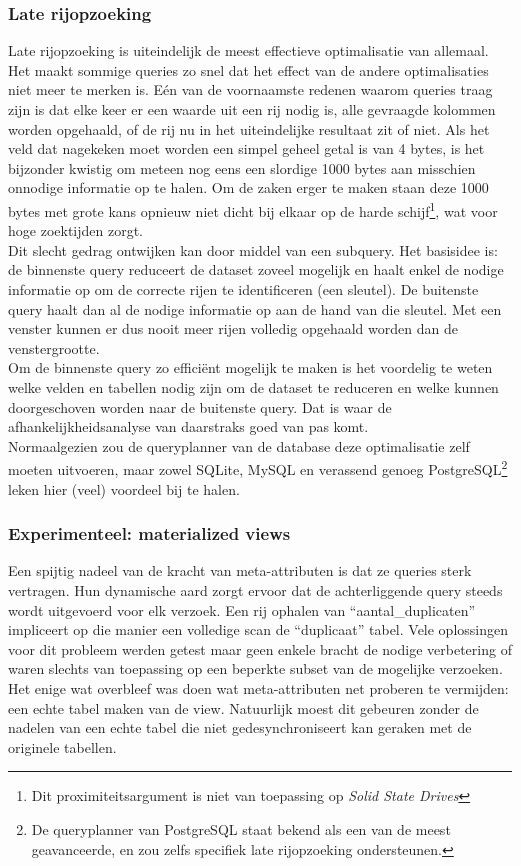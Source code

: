 \subsubsection{Late rijopzoeking}
Late rijopzoeking is uiteindelijk de meest effectieve optimalisatie van allemaal. Het maakt sommige queries zo snel dat het effect van de andere optimalisaties niet meer te merken is. E\'en van de voornaamste redenen waarom queries traag zijn is dat elke keer er een waarde uit een rij nodig is, alle gevraagde kolommen worden opgehaald, of de rij nu in het uiteindelijke resultaat zit of niet. Als het veld dat nagekeken moet worden een simpel geheel getal is van 4 bytes, is het bijzonder kwistig om meteen nog eens een slordige 1000 bytes aan misschien onnodige informatie op te halen. Om de zaken erger te maken staan deze 1000 bytes met grote kans opnieuw niet dicht bij elkaar op de harde schijf\footnote{Dit proximiteitsargument is niet van toepassing op \emph{Solid State Drives}}, wat voor hoge zoektijden zorgt.\\

Dit slecht gedrag ontwijken kan door middel van een subquery. Het basisidee is: de binnenste query reduceert de dataset zoveel mogelijk en haalt enkel de nodige informatie op om de correcte rijen te identificeren (een sleutel). De buitenste query haalt dan al de nodige informatie op aan de hand van die sleutel. Met een venster kunnen er dus nooit meer rijen volledig opgehaald worden dan de venstergrootte.\\

Om de binnenste query zo effici\"ent mogelijk te maken is het voordelig te weten welke velden en tabellen nodig zijn om de dataset te reduceren en welke kunnen doorgeschoven worden naar de buitenste query. Dat is waar de afhankelijkheidsanalyse van daarstraks goed van pas komt.\\

Normaalgezien zou de queryplanner van de database deze optimalisatie zelf moeten uitvoeren, maar zowel SQLite, MySQL en verassend genoeg PostgreSQL\footnote{De queryplanner van PostgreSQL staat bekend als een van de meest geavanceerde, en zou zelfs specifiek late rijopzoeking ondersteunen.} leken hier (veel) voordeel bij te halen.

\subsubsection{Experimenteel: materialized views}
Een spijtig nadeel van de kracht van meta-attributen is dat ze queries sterk vertragen. Hun dynamische aard zorgt ervoor dat de achterliggende query steeds wordt uitgevoerd voor elk verzoek. Een rij ophalen van ``aantal\_duplicaten'' impliceert op die manier een volledige scan de ``duplicaat'' tabel. Vele oplossingen voor dit probleem werden getest maar geen enkele bracht de nodige verbetering of waren slechts van toepassing op een beperkte subset van de mogelijke verzoeken. Het enige wat overbleef was doen wat meta-attributen net proberen te vermijden: een echte tabel maken van de view. Natuurlijk moest dit gebeuren zonder de nadelen van een echte tabel die niet gedesynchroniseert kan geraken met de originele tabellen.\\

